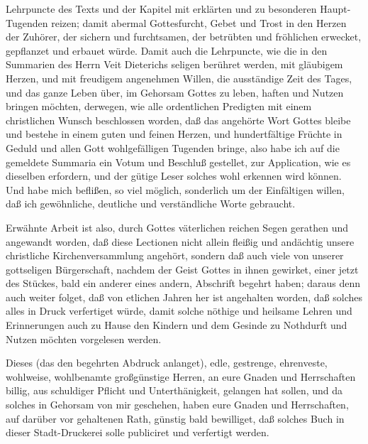 Lehrpuncte des Texts und der Kapitel mit erklärten und zu besonderen Haupt-Tugenden reizen; damit abermal Gottesfurcht, Gebet und Trost in den Herzen der Zuhörer, der sichern und furchtsamen, der betrübten und fröhlichen erwecket, gepflanzet und erbauet würde. Damit auch die Lehrpuncte, wie die in den Summarien des Herrn Veit Dieterichs seligen berühret werden, mit gläubigem Herzen, und mit freudigem angenehmen Willen, die ausständige Zeit des Tages, und das ganze Leben über, im Gehorsam Gottes zu leben, haften und Nutzen bringen möchten, derwegen, wie alle ordentlichen Predigten mit einem christlichen Wunsch beschlossen worden, daß das angehörte Wort Gottes bleibe und bestehe in einem guten und feinen Herzen, und hundertfältige Früchte in Geduld und allen Gott wohlgefälligen Tugenden bringe, also habe ich auf die gemeldete Summaria ein Votum und Beschluß gestellet, zur Application, wie es dieselben erfordern, und der gütige Leser solches wohl erkennen wird können. Und habe mich beflißen, so viel möglich, sonderlich um der Einfältigen willen, daß ich gewöhnliche, deutliche und verständliche Worte gebraucht.

Erwähnte Arbeit ist also, durch Gottes väterlichen reichen Segen gerathen und angewandt worden, daß diese Lectionen nicht allein fleißig und andächtig unsere christliche Kirchenversammlung angehört, sondern daß auch viele von unserer gottseligen Bürgerschaft, nachdem der Geist Gottes in ihnen gewirket, einer jetzt des Stückes, bald ein anderer eines andern, Abschrift begehrt haben; daraus denn auch weiter folget, daß von etlichen Jahren her ist angehalten worden, daß solches alles in Druck verfertiget würde, damit solche nöthige und heilsame Lehren und Erinnerungen auch zu Hause den Kindern und dem Gesinde zu Nothdurft und Nutzen möchten vorgelesen werden.

Dieses (das den begehrten Abdruck anlanget), edle, gestrenge, ehrenveste, wohlweise, wohlbenamte großgünstige Herren, an eure Gnaden und Herrschaften billig, aus schuldiger Pflicht und Unterthänigkeit, gelangen hat sollen, und da solches in Gehorsam von mir geschehen, haben eure Gnaden und Herrschaften, auf darüber vor gehaltenen Rath, günstig bald bewilliget, daß solches Buch in dieser Stadt-Druckerei solle publiciret und verfertigt werden.

